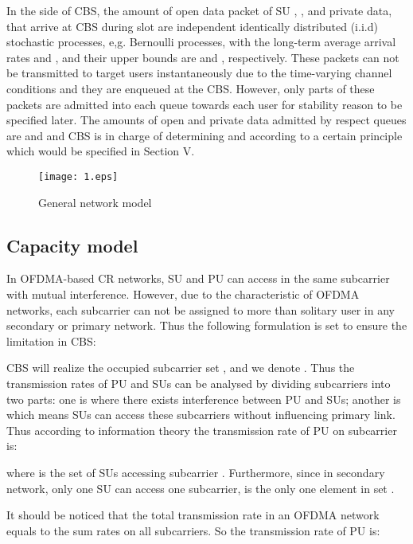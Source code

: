 \documentclass[journal]{IEEEtran}
\begin{document}
In the side of CBS, the amount of open data packet of SU , , and private data,   that arrive at CBS
during slot  are independent identically distributed (i.i.d) stochastic processes, e,g. Bernoulli processes, with the long-term average arrival rates  and , and their upper bounds are  and ,
respectively.  These packets can not be transmitted to target users instantaneously due to the time-varying channel conditions and they are enqueued at the CBS. However, only parts of these packets are admitted into each queue towards each user for stability reason to be specified later. The  amounts of  open and private data admitted by respect queues are   and  and  CBS is in charge of determining  and  according to a
certain principle which would be specified in Section V.


\begin{figure}
  \centering
\texttt{[image: 1.eps]}\\
  \caption{ General network model}\label{sysfig:2}
\end{figure}

\subsection{Capacity model}
In OFDMA-based CR networks, SU and PU can access in the same subcarrier with mutual interference. However, due to the characteristic of OFDMA networks, each subcarrier can not be assigned  to more than solitary user in any secondary or primary network. Thus the following formulation is set to
ensure the limitation in CBS:



 CBS will realize the occupied subcarrier set , and we denote
 . Thus the transmission rates of PU and SUs can be
 analysed by dividing  subcarriers into two parts: one is  where there exists interference
 between PU and SUs; another is  which means SUs can access these subcarriers without
 influencing primary link. Thus according to information theory the transmission rate of PU  on subcarrier  is:

 
 where   is the set of SUs accessing
 subcarrier . Furthermore, since in secondary network, only one SU can access one subcarrier,  is the only one
 element in set .

  It should be  noticed  that the total transmission rate in an OFDMA  network equals to the sum rates on all subcarriers.
 So the transmission rate of PU is:

 
\end{document}

